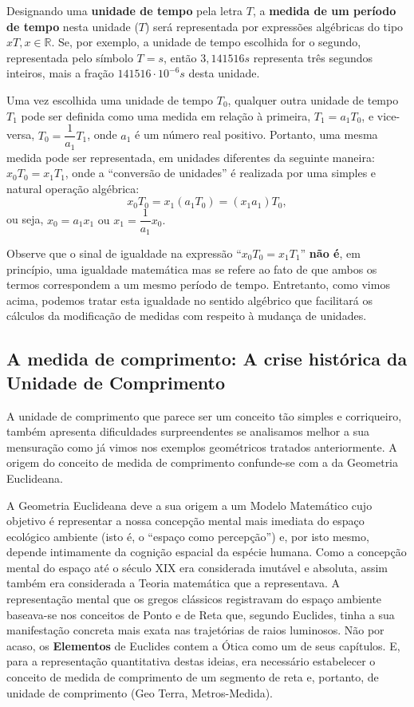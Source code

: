 Designando uma \textbf{unidade de tempo} pela letra \(T\), a \textbf{medida de um período de tempo} nesta unidade (\(T\)) será representada por expressões algébricas do tipo \(xT , x \in \mathbb{R}\). Se, por exemplo, a unidade de tempo escolhida for o segundo, representada pelo símbolo \(T = s\), então \(3,141516 s\) representa três segundos inteiros, mais a fração \(141516 \cdot 10^{-6} s\) desta unidade.

Uma vez escolhida uma unidade de tempo \(T_0\), qualquer outra unidade de tempo \(T_1\) pode ser definida como uma medida em relação à primeira, \(T_1 = a_1T_0\), e vice-versa, \(T_0 = \dfrac{1}{a_1} T_1\), onde \(a_1\) é um número real positivo. Portanto, uma mesma medida pode ser representada, em unidades diferentes da seguinte maneira:
\(x_0T_0 = x_1T_1\), onde a ``conversão de unidades'' é realizada por uma simples e natural operação algébrica:
\[x_0T_0 = x_1(a_1T_0)=(x_1a_1)T_0,\]
ou seja, \(x_0 = a_1x_1 \mbox{ ou } x_1 = \dfrac{1}{a_1}x_0.\)

Observe que o sinal de igualdade na expressão ``\(x_0T_0 = x_1T_1\)'' \textbf{não é}, em princípio, uma igualdade matemática mas se refere ao fato de que ambos os termos correspondem a um mesmo período de tempo. Entretanto, como vimos acima, podemos tratar esta igualdade no sentido algébrico que facilitará os cálculos da modificação de medidas com respeito à mudança de unidades.



\subsection{A medida de comprimento: A crise histórica da Unidade de Comprimento}

    A unidade de comprimento que parece ser um conceito tão simples e corriqueiro, também apresenta dificuldades surpreendentes se analisamos melhor a sua mensuração como já vimos nos exemplos geométricos tratados anteriormente. A origem do conceito de medida de comprimento confunde-se com a da Geometria Euclideana.

    A Geometria Euclideana deve a sua origem a um Modelo Matemático cujo objetivo é representar a nossa concepção mental mais imediata do espaço ecológico ambiente (isto é, o ``espaço como percepção'') e, por isto mesmo, depende intimamente da cognição espacial da espécie humana. Como a concepção mental do espaço até o século XIX era considerada imutável e absoluta, assim também era considerada a Teoria matemática que a representava. A representação mental que os gregos clássicos registravam do espaço ambiente baseava-se nos conceitos de Ponto e de Reta que, segundo Euclides, tinha a sua manifestação concreta mais exata nas trajetórias de raios luminosos. Não por acaso, os \textbf{Elementos} de Euclides contem a Ótica como um de seus capítulos. E, para a representação quantitativa destas ideias, era necessário estabelecer o conceito de medida de comprimento de um segmento de reta e, portanto, de unidade de comprimento (Geo Terra, Metros-Medida).

